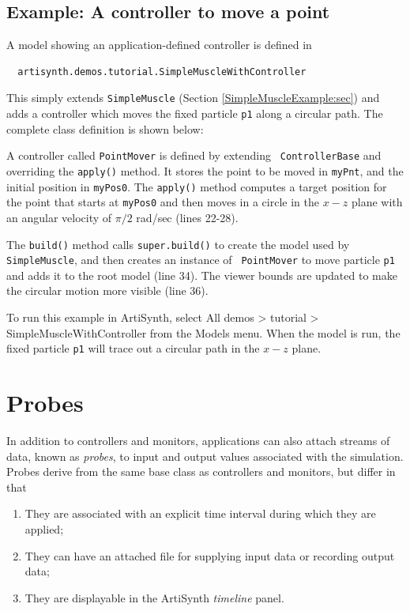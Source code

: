 \subsection{Example: A controller to move a point}

A model showing an application-defined controller is defined in
%
\begin{verbatim}
  artisynth.demos.tutorial.SimpleMuscleWithController
\end{verbatim}
%
This simply extends {\tt SimpleMuscle} (Section
\ref{SimpleMuscleExample:sec}) and adds a controller which moves the
fixed particle {\tt p1} along a circular path.  The complete class
definition is shown below:
%
\lstset{numbers=left}

\lstset{numbers=none}
%
A controller called {\tt PointMover} is defined by extending {\tt
ControllerBase} and overriding the {\tt apply()} method. It stores the
point to be moved in {\tt myPnt}, and the initial position in
{\tt myPos0}. The {\tt apply()} method computes a target position for
the point that starts at {\tt myPos0} and then moves in a circle in the
$x-z$ plane with an angular velocity of $\pi/2$ rad/sec (lines 22-28).

The {\tt build()} method calls {\tt super.build()} to create the model
used by {\tt SimpleMuscle}, and then creates an instance of {\tt
PointMover} to move particle {\tt p1} and adds it to the root model
(line 34). The viewer bounds are updated to make the circular motion
more visible (line 36).

To run this example in ArtiSynth, select {\sf All demos > tutorial >
SimpleMuscleWithController} from the {\sf Models} menu. When
the model is run, the fixed particle {\tt p1} will trace
out a circular path in the $x-z$ plane.

\section{Probes}
\label{Probes:sec}

In addition to controllers and monitors, applications can also attach
streams of data, known as {\it probes}, to input and output values
associated with the simulation. Probes derive from the same base class
 as 
controllers and monitors, 
but differ in that 

\begin{enumerate}

\item They are associated with an explicit time interval during which
they are applied;

\item They can have an attached file for supplying input data or
recording output data;

\item They are displayable in the ArtiSynth {\it timeline} panel.

\end{enumerate}

